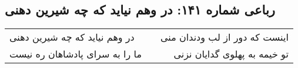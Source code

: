 \begin{center}
\section*{رباعی شماره ۱۴۱: در وهم نیاید که چه شیرین دهنی}
\label{sec:141}
\begin{longtable}{l p{0.5cm} r}
در وهم نیاید که چه شیرین دهنی
&&
اینست که دور از لب ودندان منی
\\
ما را به سرای پادشاهان ره نیست
&&
تو خیمه به پهلوی گدایان نزنی
\\
\end{longtable}
\end{center}
